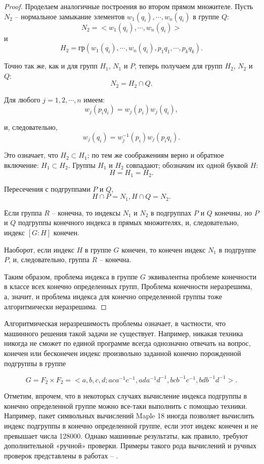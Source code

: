 \documentclass[twoside]{mfitjournal}
\begin{document}
\begin{proof}
Проделаем аналогичные построения во втором прямом множителе. Пусть $N_2$ – нормальное замыкание элементов $w_1(q_i),\cdots, w_n(q_i)$ в группе $Q$: 
\[
N_2 = <w_1(q_i),\cdots, w_n(q_i)>
\]
и
\[
H_2 = \text{гр}(w_1(q_i),\cdots, w_n(q_i), p_1q_1,\cdots, p_kq_k).
\]

Точно так же, как и для групп $H_1$, $N_1$ и $P$, теперь получаем для групп $H_2$, $N_2$ и $Q$:
\[
N_2=H_2\cap Q.
\]

Для любого $j=1, 2,\cdots, n$ имеем:
\[ 
w_j(p_iq_i)=w_j(p_i) w_j(q_i),
\]

и, следовательно,
\[
w_j(q_i)=w^{-1}_j(p_i)w_j(p_iq_i).
\]

Это означает, что $H_2 \subset H_1$; по тем же соображениям верно и обратное включение: $H_1 \subset H_2$.  Группы $H_1$ и $H_2$ совпадают; обозначим их одной буквой $H$: 
\[
H = H_1 = H_2.
\]

Пересечения с подгруппами $P$ и $Q$, 
\[
H\cap P = N_1, H\cap Q = N_2.
\]

Если группа $R$ -- конечна, то индексы  $N_1$ и $N_2$ в подгруппах $P$ и $Q$  конечны, но $P$ и $Q$ подгруппы конечного индекса в прямых множителях, и, следовательно, индекс  $ \left[G: H\right] $ конечен.

Наоборот, если индекс $H$ в группе $G$ конечен, то  конечен индекс  $N_1$ в подгруппе $P$, и, следовательно, группа $R$ – конечна.

Таким образом, проблема индекса в группе $G$ эквивалентна проблеме конечности в классе всех конечно определенных групп, Проблема конечности неразрешима, а, значит, и проблема индекса для конечно определенной группы тоже алгоритмически неразрешима.
\end{proof}

Алгоритмическая неразрешимость проблемы означает, в частности, что машинного решения такой задачи не существует. Например, никакая техника никогда не сможет по единой программе всегда однозначно отвечать на вопрос, конечен или бесконечен индекс произвольно заданной конечно порожденной подгруппы в группе

\[
G = F_2 \times F_2 = <a, b, c, d;  aca^{-1}c^{-1}, ada^{-1}d^{-1},  bcb^{-1}c^{-1}, bdb^{-1}d^{-1}>.
\]

Отметим, впрочем, что в некоторых случаях вычисление индекса подгруппы в конечно определенной группе можно все-таки выполнить с помощью техники. Например, пакет символьных вычислений Maple 18 иногда позволяет вычислить индекс подгруппы в конечно определенной группе, если этот индекс конечен и не превышает числа 128000. Однако машинные результаты, как правило, требуют дополнительной «ручной» проверки. Примеры такого рода вычислений и ручных проверок представлены в работах \cite{Gor3} – \cite{Gor6}. 
\end{document}
